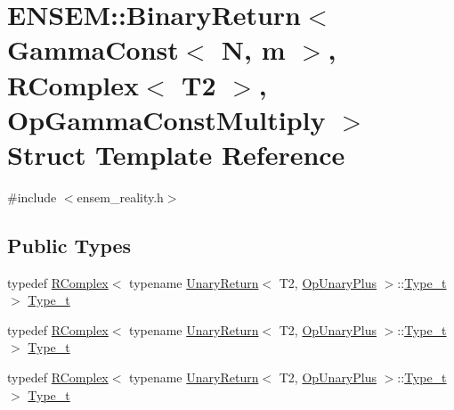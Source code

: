 \hypertarget{structENSEM_1_1BinaryReturn_3_01GammaConst_3_01N_00_01m_01_4_00_01RComplex_3_01T2_01_4_00_01OpGammaConstMultiply_01_4}{}\section{E\+N\+S\+EM\+:\+:Binary\+Return$<$ Gamma\+Const$<$ N, m $>$, R\+Complex$<$ T2 $>$, Op\+Gamma\+Const\+Multiply $>$ Struct Template Reference}
\label{structENSEM_1_1BinaryReturn_3_01GammaConst_3_01N_00_01m_01_4_00_01RComplex_3_01T2_01_4_00_01OpGammaConstMultiply_01_4}


{\ttfamily \#include $<$ensem\+\_\+reality.\+h$>$}

\subsection*{Public Types}
\begin{DoxyCompactItemize}
\item 
typedef \mbox{\hyperlink{classENSEM_1_1RComplex}{R\+Complex}}$<$ typename \mbox{\hyperlink{structENSEM_1_1UnaryReturn}{Unary\+Return}}$<$ T2, \mbox{\hyperlink{structENSEM_1_1OpUnaryPlus}{Op\+Unary\+Plus}} $>$\+::\mbox{\hyperlink{structENSEM_1_1BinaryReturn_3_01GammaConst_3_01N_00_01m_01_4_00_01RComplex_3_01T2_01_4_00_01OpGammaConstMultiply_01_4_ae674dff24be99861079dc4dea357e362}{Type\+\_\+t}} $>$ \mbox{\hyperlink{structENSEM_1_1BinaryReturn_3_01GammaConst_3_01N_00_01m_01_4_00_01RComplex_3_01T2_01_4_00_01OpGammaConstMultiply_01_4_ae674dff24be99861079dc4dea357e362}{Type\+\_\+t}}
\item 
typedef \mbox{\hyperlink{classENSEM_1_1RComplex}{R\+Complex}}$<$ typename \mbox{\hyperlink{structENSEM_1_1UnaryReturn}{Unary\+Return}}$<$ T2, \mbox{\hyperlink{structENSEM_1_1OpUnaryPlus}{Op\+Unary\+Plus}} $>$\+::\mbox{\hyperlink{structENSEM_1_1BinaryReturn_3_01GammaConst_3_01N_00_01m_01_4_00_01RComplex_3_01T2_01_4_00_01OpGammaConstMultiply_01_4_ae674dff24be99861079dc4dea357e362}{Type\+\_\+t}} $>$ \mbox{\hyperlink{structENSEM_1_1BinaryReturn_3_01GammaConst_3_01N_00_01m_01_4_00_01RComplex_3_01T2_01_4_00_01OpGammaConstMultiply_01_4_ae674dff24be99861079dc4dea357e362}{Type\+\_\+t}}
\item 
typedef \mbox{\hyperlink{classENSEM_1_1RComplex}{R\+Complex}}$<$ typename \mbox{\hyperlink{structENSEM_1_1UnaryReturn}{Unary\+Return}}$<$ T2, \mbox{\hyperlink{structENSEM_1_1OpUnaryPlus}{Op\+Unary\+Plus}} $>$\+::\mbox{\hyperlink{structENSEM_1_1BinaryReturn_3_01GammaConst_3_01N_00_01m_01_4_00_01RComplex_3_01T2_01_4_00_01OpGammaConstMultiply_01_4_ae674dff24be99861079dc4dea357e362}{Type\+\_\+t}} $>$ \mbox{\hyperlink{structENSEM_1_1BinaryReturn_3_01GammaConst_3_01N_00_01m_01_4_00_01RComplex_3_01T2_01_4_00_01OpGammaConstMultiply_01_4_ae674dff24be99861079dc4dea357e362}{Type\+\_\+t}}
\end{DoxyCompactItemize}


